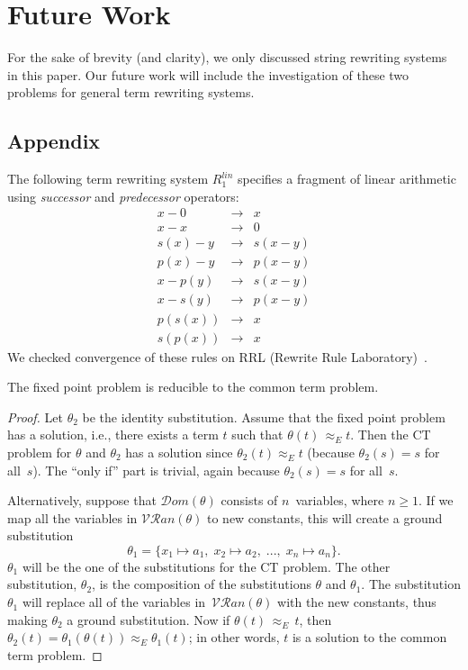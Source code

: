 \documentclass{lmcs} %
\theoremstyle{plain}\newtheorem{satz}[thm]{Satz} %
\newcommand{\dom}{\mathcal{D}om}
\newcommand{\vran}{\mathcal{V\!R}\!\mathit{an}}
\begin{document}
\section{Future Work}
For the sake of brevity (and clarity), we only discussed string
rewriting systems in this paper. Our future work will include
the investigation of these two problems for general term rewriting systems.




\begin{appendices}

\section{Appendix}
\noindent
The following term rewriting system $R_1^{{lin}}$ specifies a fragment of linear arithmetic using
\emph{successor} and \emph{predecessor} operators:
\begin{eqnarray*}
 x - 0 & \rightarrow & x \\
 x - x & \rightarrow & 0 \\
 s(x) - y & \rightarrow & s(x-y)\\
 p(x) - y & \rightarrow & p(x-y)\\
 x - p(y) & \rightarrow & s(x-y)\\
 x - s(y) & \rightarrow & p(x-y)\\
 p(s(x)) & \rightarrow & x\\
 s(p(x)) & \rightarrow & x
\end{eqnarray*}
We checked convergence of these rules on RRL (Rewrite Rule Laboratory)~\cite{RRL}. 

\begin{lem}\label{FPtoCTLemma}
The fixed point problem is reducible to the common term problem.
\end{lem}
\begin{proof}
Let $\theta_2$ be
the identity substitution. 
Assume that the fixed point problem has a solution, i.e., there exists
a term $t$ such that $\theta (t) \, \approx_E^{} t$. Then the CT problem
for $\theta$ and $\theta_2$ has a solution since
$\theta_2(t) \approx_E^{} t$ (because $\theta_2 (s) = s$ for all~$s$). The ``only if'' part is trivial, again
because $\theta_2 (s) = s$ for all~$s$.

Alternatively, suppose
that $\dom(\theta)$ consists of $n$~variables, where $n \geq 1$. If we
map all the variables in $\vran(\theta)$ to new constants, this will
create a ground substitution \[\theta_1 = \{x_1
\mapsto a_1,\; x_2 \mapsto a_2,\; ..., \;x_n \mapsto
a_n\}.\] $\theta_1$ will be the one of the substitutions for the CT
problem. The other substitution, $\theta_2$, is the composition of the
substitutions $\theta$ and $\theta_1$. The substitution $\theta_1$
will replace all of the variables in~$\vran(\theta)$ with the new
constants, thus making $\theta_2$ a ground substitution. Now
if $\theta (t) \, \approx_E^{} \, t$, then
$\theta_2 (t) = \theta_1 ( \theta (t) ) \approx_E^{} \theta_1( t )$; in other words,
$t$ is a solution to the common term problem.


\end{proof}
\end{appendices}
\end{document}
